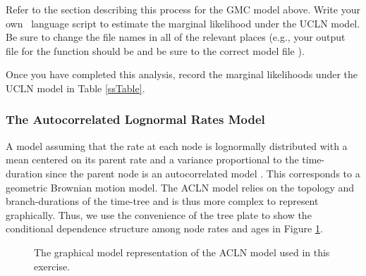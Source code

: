 Refer to the section describing this process for the GMC model above.
Write your own \Rev~language script to estimate the marginal likelihood under the UCLN model. 
Be sure to change the file names in all of the relevant places (e.g., your output file for the  function should be \colorbox{shadecolor}{} and be sure to  the correct model file \colorbox{shadecolor}{}).

{\begin{framed}
Once you have completed this analysis, record the marginal likelihoods under the UCLN model in Table \ref{ssTable}.
\end{framed}}

\bigskip
\subsubsection{The Autocorrelated Lognormal Rates Model}\label{ACLNModelSec}

A model assuming that the rate at each node is lognormally distributed with a mean centered on its parent rate and a variance proportional to the time-duration since the parent node is an autocorrelated model \citep[ACLN;][]{thorne98,kishino01,thorne02}. 
This corresponds to a geometric Brownian motion model.
The ACLN model relies on the topology and branch-durations of the time-tree and is thus more complex to represent graphically.
Thus, we use the convenience of the tree plate to show the conditional dependence structure among node rates and ages in Figure \ref{m_ACLN:fig}.

\begin{figure}[h!]
\centering
{}
\caption{\small The graphical model representation of the ACLN model used in this exercise.}
\label{m_ACLN:fig}
\end{figure}

